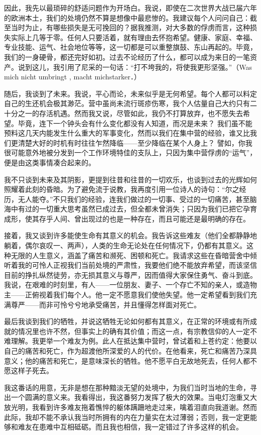 \documentclass[11pt,oneside]{book}
\begin{document}
\begin{common-format}
因此，我先以最琐碎的舒适问题作为开场白。我说，即使在二次世界大战已届六年的欧洲本土，我们的处境仍然不算是想像中最悲惨的。我建议每个人问问自己：截至当时为止，有哪些损失是无可挽回的？据我推测，对大多数的俘虏而言，这种损失实际上几等于零。任何人只要活着，就有理由去怀抱希望。健康、家庭、幸福、专业技能、运气、社会地位等等，这一切都是可以重整旗鼓、东山再起的。毕竟，我们的一身硬骨，都还完好如初。过去不论经历了什么，都可以成为来日的一笔资产。说到这儿，我引用了尼采的一句话：“打不垮我的，将使我更形坚强。”（Was mich nicht umbringt , macht michstarker．）

随后，我谈到了未来。我说，平心而论，未来似乎是无何希望。每个人都可以料定自己的生还机会极其渺茫。营中虽尚未流行斑疹伤寒，我个人估量自己大约只有二十分之一的存活机遇。然而我又说，尽管如此，我仍不打算放弃，也不愿失去希望。毕竟，连下一个钟头会有什么变化都没有人知道，而况是未来？ 我们虽不能预料这几天内能发生什么重大的军事变化，然而以我们在集中营的经验，谁又比我们更清楚大好的时机有时往往乍然降临——至少降临在某个人身上？ 譬如，你我很可能意外地被分发到一个工作环境特佳的支队上，只因为集中营俘虏的“运气”，便是由这类事情凑合起来的。

我不只谈到未来及其阴影，更提到往昔和往昔的一切欢乐，也谈到过去的光辉如何照耀着此刻的昏暗。为了避免流于说教，我再度引用一位诗人的诗句：“尔之经历，无人能夺。”不只我们的经验，连我们做过的一切事、受过的一切痛苦，甚至脑海中有过的一切重大思考虽然已成过去，但全都未曾消失；只因为我们已把它孕育成形，使其存乎人间、曾出现过的也是一种存在，而且可能还是最明确的存在。

接着，我又谈到许多能使生命有其意义的机会。我告诉这些难友（他们全都静静地躺着，偶尔哀叹一、两声），人类的生命无论处在任何情况下，仍都有其意义。这种无限的人生意义，涵盖了痛苦和濒死、困顿和死亡。我请求这些在昏暗营舍中倾听着我的可怜人正视我们当前处境的严肃性，我要他们绝不能放弃希望，而该坚信目前的挣扎纵然徒劳，亦无损其意义与尊严，因而值得大家保住勇气、奋斗到底。我说，在艰难的时刻里，有人——一位朋友、妻子、一个存亡不知的亲人，或造物主——正俯视着我们每个人。他一定不愿意我们使他失望。他一定希望看到我们充满尊严——而非可怜兮兮地承受痛苦，并且懂得怎样面对死亡。

最后我谈到我们的牺牲，并说这牺牲无论如何都有其意义，在正常的环境或有所成就的情况里也许不然，但事实上的确有其价值；而这一点，有宗教信仰的人一定不难理解。我更举一个难友为例。此人在抵达集中营时，曾试着和上苍约定：他要以自己的痛苦和死亡，作为超渡他所深爱的人的代价。在他看来，死亡和痛苦乃深具意义；他的痛苦和死亡，是意味深长的牺牲。他不愿平白无故地死去，任何人都不愿这样子死去。

我这番话的用意，无非是想在那种黯淡无望的处境中，为我们当时当地的生命，寻出一个圆满的意义来。我看得出，我这番努力发挥了极大的效果。当电灯泡重又大放光明，我看到许多难友拖着憔悴的躯体蹒跚地走过来，噙着泪直向我道谢。然而此际，我却不能不承认我当时所拥有的内在力量实在太过薄弱；否则，我一定更能够和难友在患难中互相砥砺。而且我也相信，我一定错过了许多这样的机会。



\end{common-format}
\end{document}
